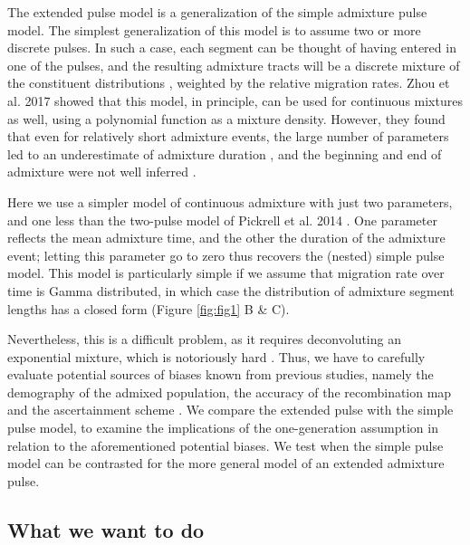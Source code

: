 \documentclass[]{article}
\begin{document}
The extended pulse model is a generalization of the simple admixture pulse model. The simplest generalization of this model is to assume two or more discrete pulses. In such a case,  each segment can be thought of having entered in one of the pulses, and the resulting admixture tracts will be a discrete mixture of the constituent distributions \citep{pickrell_ancient_2014}, weighted by the relative migration rates. Zhou et al. 2017 \citep{zhou_modeling_2017} showed that this model, in principle, can be used for continuous mixtures as well, using a polynomial function as a mixture density. However, they found that even for relatively short admixture events, the large number of parameters led to an underestimate of admixture duration \citep{zhou_inference_2017}, and the beginning and end of admixture were not well inferred
\citep{zhou_modeling_2017,zhou_inference_2017}. 

Here we use a simpler model of continuous admixture with just two parameters, and one less than the two-pulse model of Pickrell et al. 2014 \citep{pickrell_ancient_2014}. One parameter reflects the mean admixture time, and the other the duration of the admixture event; letting this parameter go to zero thus recovers the (nested) simple pulse model. 
This model is particularly simple if we assume that migration rate over time is Gamma distributed, in which case the distribution of admixture segment lengths has a closed form (Figure \ref{fig:fig1} B & C).

Nevertheless, this is a difficult problem, as it requires deconvoluting an exponential mixture, which is notoriously hard \citep{dasgupta_mixture_2008}. Thus, we have to carefully evaluate potential sources of biases known from previous studies, namely the demography of the admixed population, the accuracy of the recombination map and the ascertainment scheme \citep{sankararaman_date_2012,fu_genome_2014,moorjani_genetic_2016}.
We compare the extended pulse with the simple pulse model, to examine the implications of the one-generation assumption in relation to the aforementioned potential biases. We test when the simple pulse model can be contrasted for the more general model of an extended admixture pulse.



\subsection{What we want to do}\label{what-we-want-to-do}
\end{document}
